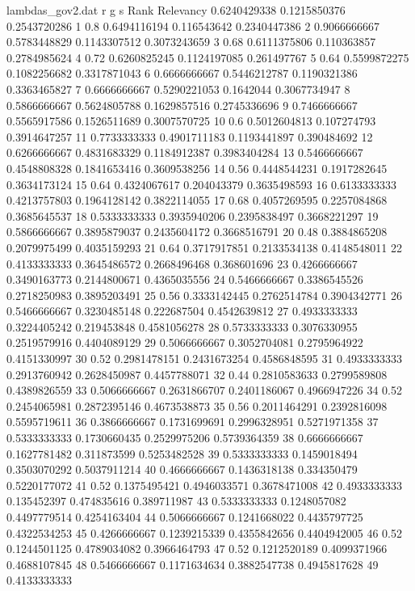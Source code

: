 \begin{filecontents*}{lambdas_gov2.dat}
r	g	s	Rank	Relevancy
0.6240429338	0.1215850376	0.2543720286	1	0.8
0.6494116194	0.116543642	0.2340447386	2	0.9066666667
0.5783448829	0.1143307512	0.3073243659	3	0.68
0.6111375806	0.110363857	0.2784985624	4	0.72
0.6260825245	0.1124197085	0.261497767	5	0.64
0.5599872275	0.1082256682	0.3317871043	6	0.6666666667
0.5446212787	0.1190321386	0.3363465827	7	0.6666666667
0.5290221053	0.1642044	0.3067734947	8	0.5866666667
0.5624805788	0.1629857516	0.2745336696	9	0.7466666667
0.5565917586	0.1526511689	0.3007570725	10	0.6
0.5012604813	0.107274793	0.3914647257	11	0.7733333333
0.4901711183	0.1193441897	0.390484692	12	0.6266666667
0.4831683329	0.1184912387	0.3983404284	13	0.5466666667
0.4548808328	0.1841653416	0.3609538256	14	0.56
0.4448544231	0.1917282645	0.3634173124	15	0.64
0.4324067617	0.204043379	0.3635498593	16	0.6133333333
0.4213757803	0.1964128142	0.3822114055	17	0.68
0.4057269595	0.2257084868	0.3685645537	18	0.5333333333
0.3935940206	0.2395838497	0.3668221297	19	0.5866666667
0.3895879037	0.2435604172	0.3668516791	20	0.48
0.3884865208	0.2079975499	0.4035159293	21	0.64
0.3717917851	0.2133534138	0.4148548011	22	0.4133333333
0.3645486572	0.2668496468	0.368601696	23	0.4266666667
0.3490163773	0.2144800671	0.4365035556	24	0.5466666667
0.3386545526	0.2718250983	0.3895203491	25	0.56
0.3333142445	0.2762514784	0.3904342771	26	0.5466666667
0.3230485148	0.222687504	0.4542639812	27	0.4933333333
0.3224405242	0.219453848	0.4581056278	28	0.5733333333
0.3076330955	0.2519579916	0.4404089129	29	0.5066666667
0.3052704081	0.2795964922	0.4151330997	30	0.52
0.2981478151	0.2431673254	0.4586848595	31	0.4933333333
0.2913760942	0.2628450987	0.4457788071	32	0.44
0.2810583633	0.2799589808	0.4389826559	33	0.5066666667
0.2631866707	0.2401186067	0.4966947226	34	0.52
0.2454065981	0.2872395146	0.4673538873	35	0.56
0.2011464291	0.2392816098	0.5595719611	36	0.3866666667
0.1731699691	0.2996328951	0.5271971358	37	0.5333333333
0.1730660435	0.2529975206	0.5739364359	38	0.6666666667
0.1627781482	0.311873599	0.5253482528	39	0.5333333333
0.1459018494	0.3503070292	0.5037911214	40	0.4666666667
0.1436318138	0.334350479	0.5220177072	41	0.52
0.1375495421	0.4946033571	0.3678471008	42	0.4933333333
0.135452397	0.474835616	0.389711987	43	0.5333333333
0.1248057082	0.4497779514	0.4254163404	44	0.5066666667
0.1241668022	0.4435797725	0.4322534253	45	0.4266666667
0.1239215339	0.4355842656	0.4404942005	46	0.52
0.1244501125	0.4789034082	0.3966464793	47	0.52
0.1212520189	0.4099371966	0.4688107845	48	0.5466666667
0.1171634634	0.3882547738	0.4945817628	49	0.4133333333

\end{filecontents*}
